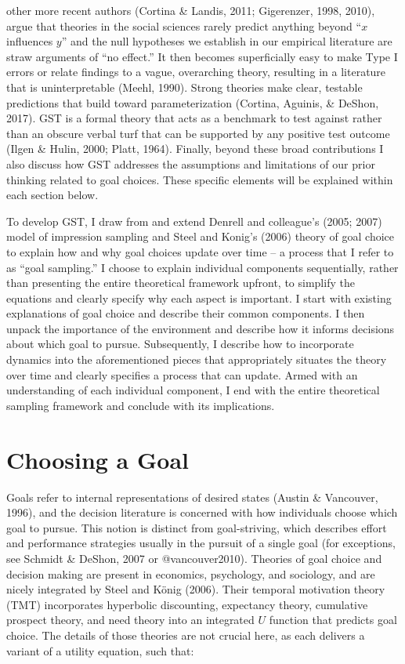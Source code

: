 \documentclass[english,,man]{apa6}
\theoremstyle{definition}
\theoremstyle{definition}
\theoremstyle{definition}
\theoremstyle{remark}
\begin{document}
other more recent authors (Cortina \& Landis, 2011; Gigerenzer, 1998,
2010), argue that theories in the social sciences rarely predict
anything beyond \enquote{\(x\) influences \(y\)} and the null hypotheses
we establish in our empirical literature are straw arguments of
\enquote{no effect.} It then becomes superficially easy to make Type I
errors or relate findings to a vague, overarching theory, resulting in a
literature that is uninterpretable (Meehl, 1990). Strong theories make
clear, testable predictions that build toward parameterization (Cortina,
Aguinis, \& DeShon, 2017). GST is a formal theory that acts as a
benchmark to test against rather than an obscure verbal turf that can be
supported by any positive test outcome (Ilgen \& Hulin, 2000; Platt,
1964). Finally, beyond these broad contributions I also discuss how GST
addresses the assumptions and limitations of our prior thinking related
to goal choices. These specific elements will be explained within each
section below.

To develop GST, I draw from and extend Denrell and colleague's (2005;
2007) model of impression sampling and Steel and Konig's (2006) theory
of goal choice to explain how and why goal choices update over time -- a
process that I refer to as \enquote{goal sampling.} I choose to explain
individual components sequentially, rather than presenting the entire
theoretical framework upfront, to simplify the equations and clearly
specify why each aspect is important. I start with existing explanations
of goal choice and describe their common components. I then unpack the
importance of the environment and describe how it informs decisions
about which goal to pursue. Subsequently, I describe how to incorporate
dynamics into the aforementioned pieces that appropriately situates the
theory over time and clearly specifies a process that can update. Armed
with an understanding of each individual component, I end with the
entire theoretical sampling framework and conclude with its
implications.

\hypertarget{choosing-a-goal}{%
\section{Choosing a Goal}\label{choosing-a-goal}}

Goals refer to internal representations of desired states (Austin \&
Vancouver, 1996), and the decision literature is concerned with how
individuals choose which goal to pursue. This notion is distinct from
goal-striving, which describes effort and performance strategies usually
in the pursuit of a single goal (for exceptions, see Schmidt \& DeShon,
2007 or @vancouver2010). Theories of goal choice and decision making are
present in economics, psychology, and sociology, and are nicely
integrated by Steel and König (2006). Their temporal motivation theory
(TMT) incorporates hyperbolic discounting, expectancy theory, cumulative
prospect theory, and need theory into an integrated \(U\) function that
predicts goal choice. The details of those theories are not crucial
here, as each delivers a variant of a utility equation, such that:
\end{document}
